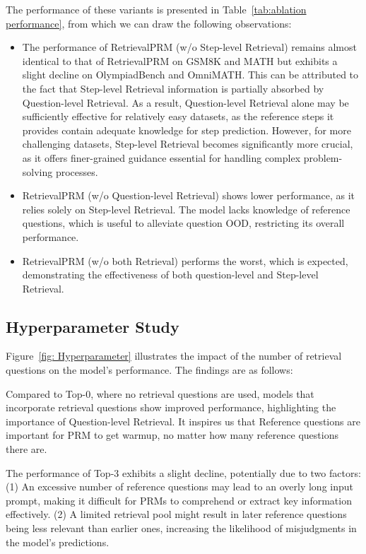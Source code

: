 The performance of these variants is presented in Table~\ref{tab:ablation performance}, from which we can draw the following observations:
\begin{itemize}[leftmargin=10pt]
    \item The performance of RetrievalPRM (w/o Step-level Retrieval) remains almost identical to that of RetrievalPRM on GSM8K and MATH but exhibits a slight decline on OlympiadBench and OmniMATH. This can be attributed to the fact that Step-level Retrieval information is partially absorbed by Question-level Retrieval. As a result, Question-level Retrieval alone may be sufficiently effective for relatively easy datasets, as the reference steps it provides contain adequate knowledge for step prediction. However, for more challenging datasets, Step-level Retrieval becomes significantly more crucial, as it offers finer-grained guidance essential for handling complex problem-solving processes.
    \item RetrievalPRM (w/o Question-level Retrieval) shows lower performance, as it relies solely on Step-level Retrieval. The model lacks knowledge of reference questions, which is useful to alleviate question OOD, restricting its overall performance. 
    \item RetrievalPRM (w/o both Retrieval) performs the worst, which is expected, demonstrating the effectiveness of both question-level and Step-level Retrieval.
\end{itemize}

\subsection{Hyperparameter Study}


Figure~\ref{fig: Hyperparameter} illustrates the impact of the number of retrieval questions on the model's performance. The findings are as follows:

Compared to Top-0, where no retrieval questions are used, models that incorporate retrieval questions show improved performance, highlighting the importance of Question-level Retrieval. It inspires us that Reference questions are important for PRM to get warmup, no matter how many reference questions there are.

The performance of Top-3 exhibits a slight decline, potentially due to two factors: (1) An excessive number of reference questions may lead to an overly long input prompt, making it difficult for PRMs to comprehend or extract key information effectively. (2) A limited retrieval pool might result in later reference questions being less relevant than earlier ones, increasing the likelihood of misjudgments in the model’s predictions.








